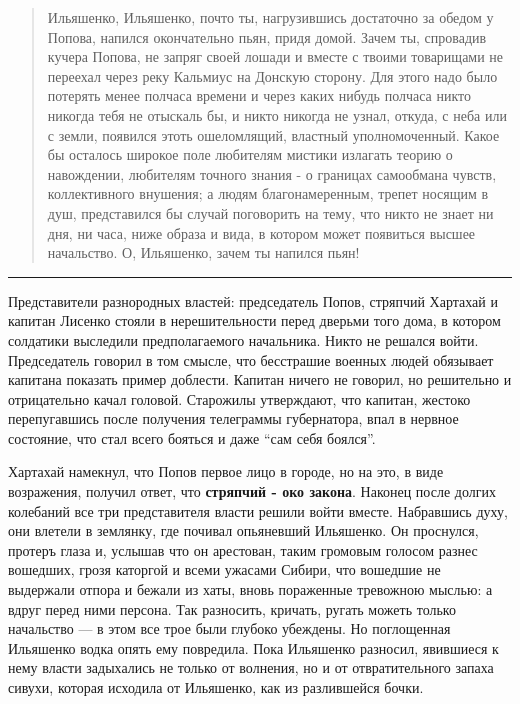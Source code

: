 \documentclass[a4paper,20pt]{report}
\begin{document}
\begin{quote}
\em\bfseries
	
Ильяшенко, Ильяшенко, почто ты, нагрузившись достаточно за обедом у Попова,
напился окончательно пьян, придя домой. Зачем ты, спровадив кучера Попова, не
запряг своей лошади и вместе с твоими товарищами не переехал через реку
Кальмиус на Донскую сторону. Для этого надо было потерять менее полчаса времени
и через каких нибудь полчаса никто никогда тебя не отыскаль бы, и никто никогда
не узнал, откуда, с неба или с земли, появился этоть ошеломлящий, властный
уполномоченный. Какое бы осталось широкое поле любителям мистики излагать
теорию о навождении, любителям точного знания - о границах самообмана чувств,
коллективного внушения; а людям благонамеренным, трепет носящим в душ,
представился бы случай поговорить на тему, что никто не знает ни дня, ни часа,
ниже образа и вида, в котором может появиться высшее начальство. О, Ильяшенко,
зачем ты напился пьян!

\end{quote}

\par\noindent\rule{\textwidth}{0.4pt}

Представители разнородных властей: председатель Попов, стряпчий Хартахай и
капитан Лисенко стояли в нерешительности перед дверьми того дома, в котором
солдатики выследили предполагаемого начальника. Никто не решался войти.
Председатель говорил в том смысле, что бесстрашие военных людей обязывает
капитана показать пример доблести. Капитан ничего не говорил, но решительно и
отрицательно качал головой. Старожилы утверждают, что капитан, жестоко
перепугавшись после получения телеграммы губернатора, впал в нервное состояние,
что стал всего бояться и даже ``сам себя боялся''.

Хартахай намекнул, что Попов первое лицо в городе,
но на это, в виде возражения, получил ответ, что \textbf{стряпчий - око закона}.
Наконец после долгих колебаний все три представителя власти решили войти вместе.
Набравшись духу, они влетели в землянку, где почивал опьяневший Ильяшенко.
Он проснулся, протеръ глаза и, услышав что он
арестован, таким громовым голосом разнес вошедших,
грозя каторгой и всеми ужасами Сибири, что вошедшие не
выдержали отпора и бежали из хаты, вновь пораженные
тревожною мыслью: а вдруг перед ними персона. Так
разносить, кричать, ругать можеть только начальство — в
этом все трое были глубоко убеждены. Но поглощенная
Ильяшенко водка опять ему повредила. Пока Ильяшенко
разносил, явившиеся к нему власти задыхались не только
от волнения, но и от отвратительного запаха сивухи, которая 
исходила от Ильяшенко, как из разлившейся бочки.
\end{document}
